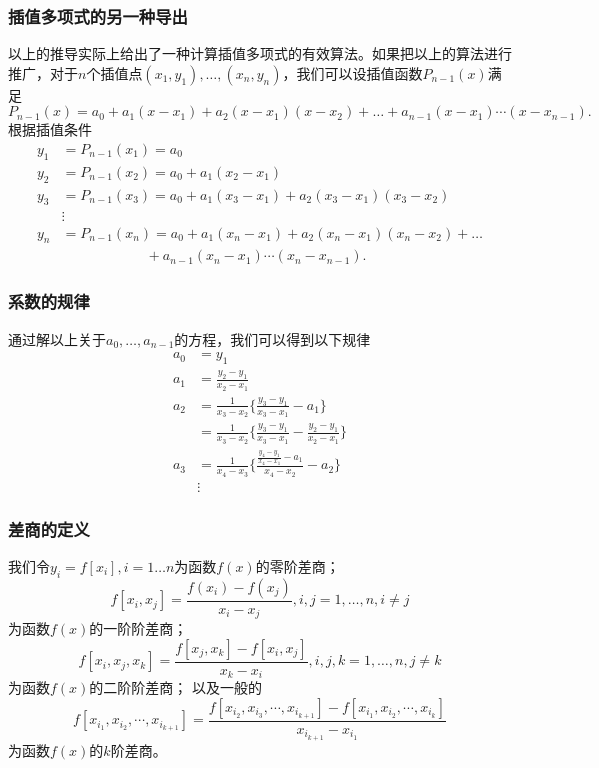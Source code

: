 \documentclass[10pt]{beamer}
\begin{document}
\begin{frame}
\frametitle{插值多项式的另一种导出}
以上的推导实际上给出了一种计算插值多项式的有效算法。如果把以上的算法进行推广，对于$n$个插值点$(x_1, y_1), \ldots, (x_n,y_n)$，我们可以设插值函数$P_{n-1}(x)$满足
\begin{equation}
P_{n-1}(x) = a_0 + a_1(x - x_1) + a_2(x - x_1)(x-x_2)+ \ldots + a_{n-1}(x - x_1) \cdots (x - x_{n-1}).
\end{equation}
根据插值条件
\begin{align}
y_1 &= P_{n-1}(x_1) = a_0 \nonumber \\
y_2 &= P_{n-1}(x_2) = a_0 + a_1(x_2 - x_1) \nonumber \\
y_3 &= P_{n-1}(x_3) = a_0 + a_1(x_3 - x_1) + a_2(x_3 - x_1)(x_3 - x_2) \nonumber \\
&\vdots \nonumber \\
y_n &=  P_{n-1}(x_n) = a_0 + a_1(x_n - x_1) + a_2(x_n - x_1)(x_n  - x_2) + \ldots \nonumber \\
       & \quad \quad \quad  \quad \quad \quad + a_{n-1}(x_n - x_1) \cdots (x_n - x_{n-1}).
\end{align}
\end{frame}


\begin{frame}
\frametitle{系数的规律}
通过解以上关于$a_0, \ldots, a_{n-1}$的方程，我们可以得到以下规律
\begin{align}
a_0   & = y_1 \nonumber \\
a_1   & = \frac{y_2 - y_1}{x_2 - x_1}  \nonumber \\
a _2  & = \frac{1}{x_3 - x_2} \big\{\frac{y_3 - y_1}{x_3 - x_1} -   a_1\big\} \nonumber \\
         & =  \frac{1}{x_3 - x_2} \big\{\frac{y_3 - y_1}{x_3 - x_1} -    \frac{y_2 - y_1}{x_2 - x_1} \big\} \nonumber \\
a_3  & = \frac{1}{x_4 - x_3} \big\{ \frac{\frac{y_4 - y_1}{x_4 - x_1} -   a_1}{x_4 - x_2}  - a_2 \big\}  \nonumber \\
&\vdots
\end{align}
\end{frame}


\begin{frame}
\frametitle{差商的定义}
\begin{definition}[差商]
我们令$y_i = f[x_i], i = 1 \ldots n$为函数$f(x)$的零阶差商；
\begin{equation}
f[x_i, x_j] = \frac{f(x_i) - f(x_j)}{x_i - x_j}, i ,j = 1, \ldots, n, i \neq j
\end{equation}
为函数$f(x)$的一阶阶差商；
\begin{equation}
f[x_i, x_j,x_k] = \frac{f[x_j ,x_k] - f[x_i, x_j]}{x_k - x_i}, i ,j ,k= 1, \ldots, n, j \neq k
\end{equation}
为函数$f(x)$的二阶阶差商；
以及一般的
\begin{equation}
f[x_{i_1}, x_{i_2}, \cdots, x_{i_{k+1}}] = \frac{f[x_{i_2}, x_{i_3}, \cdots, x_{i_{k+1}}] - f[x_{i_1}, x_{i_2}, \cdots, x_{i_{k}}]}{x_{i_{k+1}} - x_{i_1}}
\end{equation}
为函数$f(x)$的$k$阶差商。
\end{definition}
\end{frame}
\end{document}

